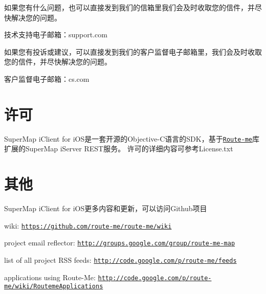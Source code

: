 \begin{DoxyItemize}
\item 如果您有什么问题，也可以直接发到我们的信箱里我们会及时收取您的信件，并尽快解决您的问题。
\item 技术支持电子邮箱：support.com
\item 如果您有投诉或建议，可以直接发到我们的客户监督电子邮箱里，我们会及时收取您的信件，并尽快解决您的问题。
\item 客户监督电子邮箱：cs.com
\end{DoxyItemize}\hypertarget{index_许可}{}\section{许可}\label{index_许可}
Super\-Map i\-Client for i\-O\-S是一套开源的\-Objective-\/\-C语言的\-S\-D\-K，基于\href{ https://github.com/route-me/route-me}{\tt Route-\/me}库扩展的\-Super\-Map i\-Server R\-E\-S\-T服务。 许可的详细内容可参考\-License.\-txt\hypertarget{index_其他}{}\section{其他}\label{index_其他}
Super\-Map i\-Client for i\-O\-S更多内容和更新，可以访问\-Github项目
\begin{DoxyItemize}
\item wiki\-: \href{https://github.com/route-me/route-me/wiki}{\tt https\-://github.\-com/route-\/me/route-\/me/wiki}
\item project email reflector\-: \href{http://groups.google.com/group/route-me-map}{\tt http\-://groups.\-google.\-com/group/route-\/me-\/map}
\item list of all project R\-S\-S feeds\-: \href{http://code.google.com/p/route-me/feeds}{\tt http\-://code.\-google.\-com/p/route-\/me/feeds}
\item applications using Route-\/\-Me\-: \href{http://code.google.com/p/route-me/wiki/RoutemeApplications}{\tt http\-://code.\-google.\-com/p/route-\/me/wiki/\-Routeme\-Applications} 
\end{DoxyItemize}